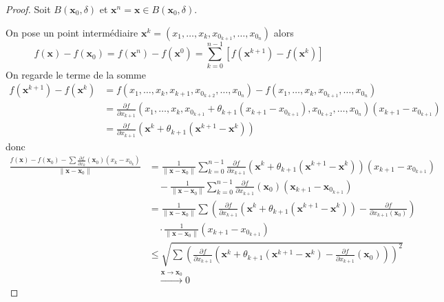 \begin{proof} 
Soit $B(\boldsymbol{x}_{0},\delta)$ et $\boldsymbol{x}^{n}=\boldsymbol{x}\in B(\boldsymbol{x}_{0},\delta)$. 

On pose un point intermédiaire $\boldsymbol{x}^{k}=(x_{1},\dots,x_{k},x_{0_{k+1}},\dots,x_{0_{n}})$ alors
$$
f(\boldsymbol{x})-f(\boldsymbol{x}_{0})=f(\boldsymbol{x}^{n})-f(\boldsymbol{x}^{0})=\sum_{k=0}^{n-1} [f(\boldsymbol{x}^{k+1})-f(\boldsymbol{x}^{k})]
$$
On regarde le terme de la somme
\begin{align*}
f(\boldsymbol{x}^{k+1})-f(\boldsymbol{x}^{k}) & =f(x_{1},\dots,x_{k},x_{k+1},x_{0_{k+2}},\dots,x_{0_{n}})-f(x_{1},\dots,x_{k},x_{0_{k+1}},\dots,x_{0_{n}}) \\
 & =\frac{ \partial f }{ \partial x_{k+1} } (x_{1},\dots,x_{k},x_{0_{k+1}}+\theta _{k+1}(x_{k+1}-x_{0_{k+1}}),x_{0_{k+2}},\dots,x_{0_{n}})(x_{k+1}-x_{0_{k+1}})   \\
 & =\frac{ \partial f }{ \partial x_{k+1} } (\boldsymbol{x}^{k}+\theta _{k+1}(\boldsymbol{x}^{k+1}-\boldsymbol{x}^{k}))
\end{align*}
donc 
\begin{align*}
\frac{f(\boldsymbol{x})-f(\boldsymbol{x}_{0})-\sum \frac{ \partial f }{ \partial x_{k} } (\boldsymbol{x}_{0})(x_{k}-x_{0_{k}})}{\lVert \boldsymbol{x}-\boldsymbol{x}_{0} \rVert } & = \frac{1}{\lVert \boldsymbol{x}-\boldsymbol{x}_{0} \rVert } \sum_{k=0}^{n-1} \frac{ \partial f }{ \partial x_{k+1} } (\boldsymbol{x}^{k}+\theta _{k+1}(\boldsymbol{x}^{k+1}-\boldsymbol{x}^{k}))(x_{k+1}-x_{0_{k+1}}) \\
  & \quad -\frac{1}{\lVert \boldsymbol{x}-\boldsymbol{x}_{0} \rVert }\sum_{k=0}^{n-1}  \frac{ \partial f }{ \partial x_{k+1} } (\boldsymbol{x}_{0})(\boldsymbol{x}_{k+1}-\boldsymbol{x}_{0_{k+1}}) \\
 & = \frac{1}{\lVert \boldsymbol{x}-\boldsymbol{x}_{0} \rVert }\sum\left( \frac{ \partial f }{ \partial x_{k+1} } (\boldsymbol{x}^{k}+\theta _{k+1}(\boldsymbol{x}^{k+1}-\boldsymbol{x}^{k}) )-\frac{ \partial f }{ \partial x_{k+1}(\boldsymbol{x}_{0}) }  \right)
 \\
 & \quad  \cdot\frac{1}{\lVert \boldsymbol{x}-\boldsymbol{x}_{0} \rVert }(x_{k+1}-x_{0_{k+1}})\\
 & \le \sqrt{ \sum\left( \frac{ \partial f }{ \partial x_{k+1} } \left( \boldsymbol{x}^{k}+\theta _{k+1}(\boldsymbol{x}^{k+1}-\boldsymbol{x}^{k})-\frac{ \partial f }{ \partial x_{k+1} } (\boldsymbol{x}_{0}) \right)  \right)^{2} }\\ & \quad \overset{\boldsymbol{x}\to \boldsymbol{x}_{0}} \to 0 
\end{align*}
\end{proof}

